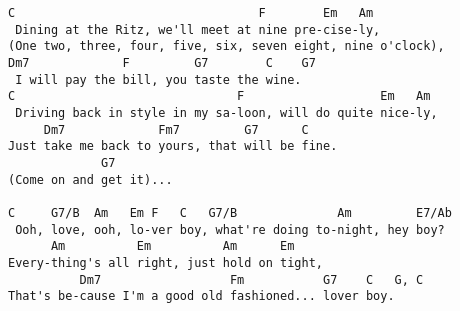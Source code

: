 \begin{verbatim}
C                                  F        Em   Am
 Dining at the Ritz, we'll meet at nine pre-cise-ly,
(One two, three, four, five, six, seven eight, nine o'clock),
Dm7             F         G7        C    G7
 I will pay the bill, you taste the wine.
C                               F                   Em   Am
 Driving back in style in my sa-loon, will do quite nice-ly,
     Dm7             Fm7         G7      C
Just take me back to yours, that will be fine.
             G7
(Come on and get it)...

C     G7/B  Am   Em F   C   G7/B              Am         E7/Ab
 Ooh, love, ooh, lo-ver boy, what're doing to-night, hey boy?
      Am          Em          Am      Em
Every-thing's all right, just hold on tight,
          Dm7                  Fm           G7    C   G, C
That's be-cause I'm a good old fashioned... lover boy.
\end{verbatim}